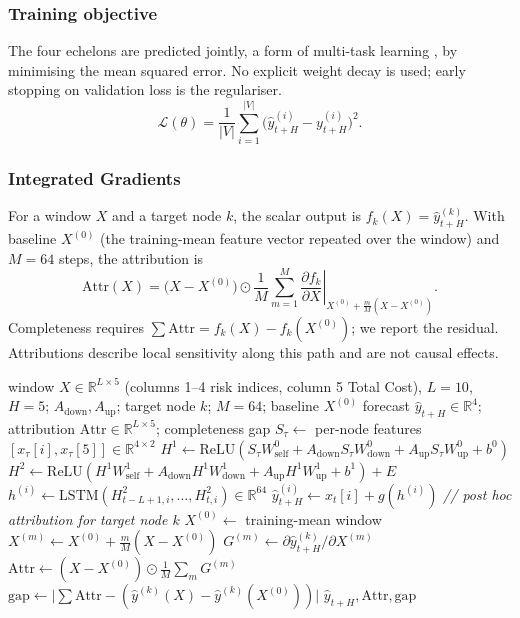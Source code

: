 \documentclass[conference]{IEEEtran}
\newcommand{\ReLU}{\mathrm{ReLU}}
\begin{document}
\subsubsection{Training objective}
The four echelons are predicted jointly, a form of multi-task learning \cite{r14}, by minimising the mean squared error. No explicit weight decay is used; early stopping on validation loss is the regulariser.
\begin{equation}
\mathcal{L}(\theta)=\frac{1}{|V|}\sum_{i=1}^{|V|}\big(\hat{y}^{(i)}_{t+H}-y^{(i)}_{t+H}\big)^2 .
\end{equation}

\subsubsection{Integrated Gradients}
For a window $X$ and a target node $k$, the scalar output is $f_k(X)=\hat{y}^{(k)}_{t+H}$. With baseline $X^{(0)}$ (the training-mean feature vector repeated over the window) and $M=64$ steps, the attribution is
\begin{equation}
\mathrm{Attr}(X)=\big(X-X^{(0)}\big)\odot\frac{1}{M}\sum_{m=1}^{M}\left.\frac{\partial f_k}{\partial X}\right|_{X^{(0)}+\frac{m}{M}(X-X^{(0)})}.
\end{equation}
Completeness requires $\sum\mathrm{Attr}=f_k(X)-f_k(X^{(0)})$; we report the residual. Attributions describe local sensitivity along this path and are not causal effects.

\begin{algorithm}[t]
\caption{SupplyGuard Forecasting and Attribution}
\label{alg:sg}
\begin{algorithmic}[1]
\small
\Require window $X\in\mathbb{R}^{L\times5}$ (columns 1--4 risk indices, column 5 Total Cost), $L=10$, $H=5$; $A_{\mathrm{down}},A_{\mathrm{up}}$; target node $k$; $M=64$; baseline $X^{(0)}$
\Ensure forecast $\hat{y}_{t+H}\in\mathbb{R}^4$; attribution $\mathrm{Attr}\in\mathbb{R}^{L\times5}$; completeness gap
  \State $S_\tau\gets$ per-node features $[x_\tau[i],x_\tau[5]]\in\mathbb{R}^{4\times2}$
  \State $H^1\gets\ReLU(S_\tau W^0_{\mathrm{self}}+A_{\mathrm{down}}S_\tau W^0_{\mathrm{down}}+A_{\mathrm{up}}S_\tau W^0_{\mathrm{up}}+b^0)$
  \State $H^2\gets\ReLU(H^1W^1_{\mathrm{self}}+A_{\mathrm{down}}H^1W^1_{\mathrm{down}}+A_{\mathrm{up}}H^1W^1_{\mathrm{up}}+b^1)+E$
\EndFor
{} 
  \State $h^{(i)}\gets\mathrm{LSTM}(H^2_{t-L+1,i},\dots,H^2_{t,i})\in\mathbb{R}^{64}$
  \State $\hat{y}^{(i)}_{t+H}\gets x_t[i]+g(h^{(i)})$
\EndFor
\State \textit{// post hoc attribution for target node $k$}
\State $X^{(0)}\gets$ training-mean window
  \State $X^{(m)}\gets X^{(0)}+\frac{m}{M}(X-X^{(0)})$
  \State $G^{(m)}\gets\partial\hat{y}^{(k)}_{t+H}/\partial X^{(m)}$
\EndFor
\State $\mathrm{Attr}\gets(X-X^{(0)})\odot\frac{1}{M}\sum_m G^{(m)}$
\State $\mathrm{gap}\gets\big|\sum\mathrm{Attr}-(\hat{y}^{(k)}(X)-\hat{y}^{(k)}(X^{(0)}))\big|$
\State \Return $\hat{y}_{t+H},\mathrm{Attr},\mathrm{gap}$
\end{algorithmic}
\end{algorithm}
\end{document}
